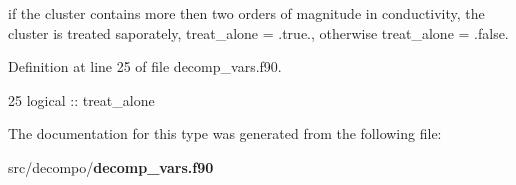 if the cluster contains more then two orders of magnitude in conductivity, the cluster is treated saporately, treat\+\_\+alone = .true., otherwise treat\+\_\+alone = .false. 



Definition at line 25 of file decomp\+\_\+vars.\+f90.


\begin{DoxyCode}
25     \textcolor{keywordtype}{logical} :: treat\_alone
\end{DoxyCode}


The documentation for this type was generated from the following file\+:\begin{DoxyCompactItemize}
\item 
src/decompo/{\bf decomp\+\_\+vars.\+f90}\end{DoxyCompactItemize}

